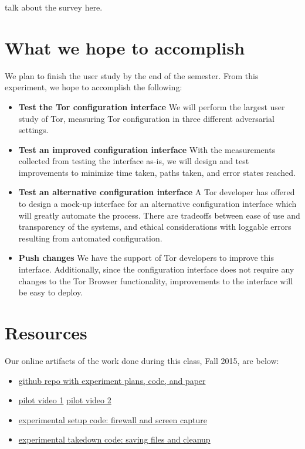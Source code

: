 \documentclass{template}
\begin{document}
{\color {red} talk about the survey here.} 


\section{What we hope to accomplish}

We plan to finish the user study by the end of the semester. 
From this experiment, we hope to accomplish the following: 

\begin{itemize} \itemsep1pt \parskip0pt 
\item {\bfseries Test the Tor configuration interface} We will perform the largest user study 
of Tor, measuring Tor configuration in three different adversarial settings. 
\item {\bfseries Test an improved configuration interface} With the measurements collected
from testing the interface as-is, we will design and test improvements to minimize
time taken, paths taken, and error states reached.
\item {\bfseries Test an alternative configuration interface} A Tor developer has offered
to design a mock-up interface for an alternative configuration interface which will
greatly automate the process. There are tradeoffs between ease of use and transparency
of the systems, and ethical considerations with loggable errors resulting from automated configuration. 
\item {\bfseries Push changes} We have the support of Tor developers
to improve this interface. Additionally, since the configuration interface does not require 
any changes to the Tor Browser functionality, improvements to the interface will
be easy to deploy. 
\end{itemize}

\section{Resources}
\noindent Our online artifacts of the work done during this class, Fall 2015,
are below: 
\begin{itemize} \itemsep1pt \parskip0pt 
\item \href{https://github.com/lindanlee/circumvention-ux-tor}{github repo with experiment plans, code, and paper}
\item \href {https://github.com/lindanlee/circumvention-ux-tor/blob/master/pilot/1-strict.mp4}{pilot video 1}
	\href{https://github.com/lindanlee/circumvention-ux-tor/blob/master/pilot/2-lax.mp4}{pilot video 2}
\item \href{https://github.com/lindanlee/circumvention-ux-tor/blob/master/setup/setup-environment}{experimental setup code: firewall and screen capture} 
\item \href{https://github.com/lindanlee/circumvention-ux-tor/blob/master/setup/takedown-environment}{experimental takedown code: saving files and cleanup} 
\end{itemize}
\end{document}
